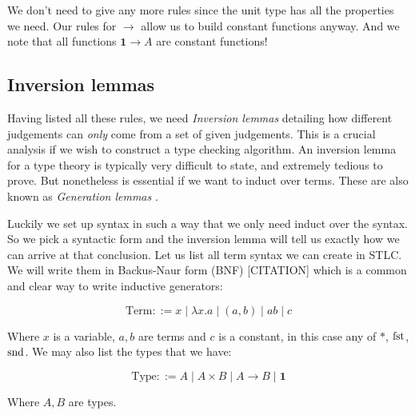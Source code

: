 \begin{remark}
    We don't need to give any more rules since the unit type has all the properties we need. Our rules for $\to$ allow us to build constant functions anyway. And we note that all functions $\mathbf{1} \to A$ are constant functions!
\end{remark}

\subsection{Inversion lemmas}
Having listed all these rules, we need \emph{Inversion lemmas} detailing how different judgements can \emph{only} come from a set of given judgements. This is a crucial analysis if we wish to construct a type checking algorithm. An inversion lemma for a type theory is typically very difficult to state, and extremely tedious to prove. But nonetheless is essential if we want to induct over terms. These are also known as \emph{Generation lemmas} \cite{Sorensen, harper_2016}.

Luckily we set up syntax in such a way that we only need induct over the syntax. So we pick a syntactic form and the inversion lemma will tell us exactly how we can arrive at that conclusion. Let us list all term syntax we can create in STLC. We will write them in Backus-Naur form (BNF) [CITATION] which is a common and clear way to write inductive generators:

$$
    \mathrm{Term} ::= x \mid \lambda x . a \mid (a, b) \mid a b \mid c
$$

Where $x$ is a variable, $a, b$ are terms and $c$ is a constant, in this case any of $*$, $\mathrm{fst}$, $\mathrm{snd}$. We may also list the types that we have:

$$
    \mathrm{Type} ::= A \mid A \times B \mid A \to B \mid \mathbf{1}
$$

Where $A, B$ are types.


